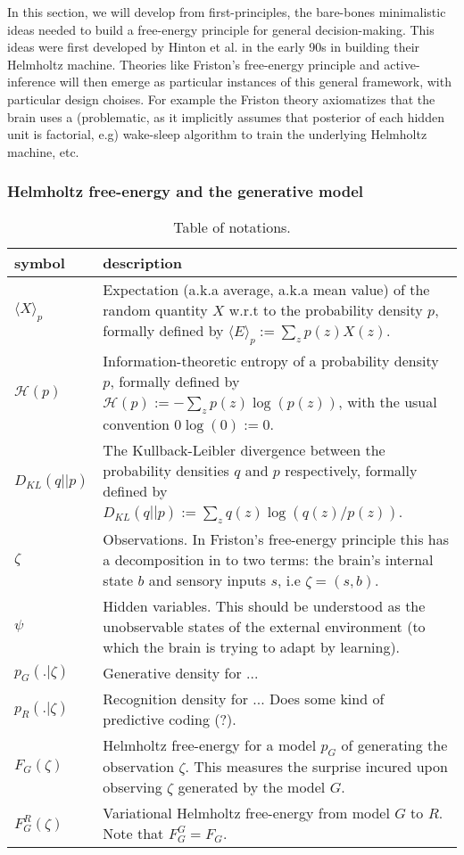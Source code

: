 \documentclass{article} %
\begin{document}
In this section, we will develop from first-principles, the bare-bones minimalistic ideas needed to build a free-energy principle for general decision-making. This ideas were first developed by Hinton et al. in the early 90s in building their Helmholtz machine. Theories like Friston's free-energy principle and active-inference will then emerge as particular instances of this general framework, with particular design choises. For example the Friston theory axiomatizes that the brain uses a (problematic, as it implicitly assumes that posterior of each hidden unit is factorial, e.g) wake-sleep algorithm to train the underlying Helmholtz machine, etc.

\subsubsection{Helmholtz free-energy and the generative model}
\begin{table}[H]
  \begin{tabular}{p{2cm}|p{11cm}}
         \hline
         \textbf{symbol}    & \textbf{description}  \\ \hline
         $\langle X\rangle_p$ & Expectation (a.k.a average, a.k.a mean value) of the
         random quantity $X$ w.r.t to the probability density $p$, formally defined by $\langle E\rangle_p := \sum_{z}p(z)X(z)$.\\ \hline
         $\mathcal H(p)$ & Information-theoretic entropy of a probability density $p$, formally defined by $\mathcal H(p) := -\sum_{z}p(z)\log(p(z))$,
          with the usual convention $0 \log(0) := 0$.\\ \hline
         $D_{KL}(q||p)$ & The Kullback-Leibler divergence between the probability densities $q$ and $p$ respectively, formally defined by $D_{KL}(q||p) := \sum_{z}q(z)\log(q(z)/p(z))$.\\ \hline
             $\zeta$ & Observations. In Friston's free-energy principle this has a decomposition in to two terms: the brain's internal state $b$ and sensory inputs $s$, i.e $\zeta = (s, b).$ \\ \hline
             $\psi$ & Hidden variables. This should be understood as the unobservable states of the external environment (to which the brain is trying to adapt by learning).\\ \hline
             $p_G(.|\zeta)$ & Generative density for ...\\ \hline
         $p_R(.|\zeta)$ & Recognition density for ... Does some kind of predictive coding (?).\\ \hline
         $F_G(\zeta)$ & Helmholtz free-energy for a model $p_G$ of generating the observation $\zeta$. This measures the surprise incured upon observing $\zeta$ generated by the model $G$.\\ \hline
         $F^R_G(\zeta)$ & Variational Helmholtz free-energy from model $G$
          to $R$.  Note that $F^G_G = F_G$.\\ \hline
  \end{tabular}
  \caption{Table of notations.}
\end{table}
\end{document}
